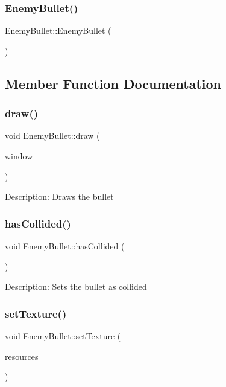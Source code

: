 \subsubsection{\texorpdfstring{EnemyBullet()}{EnemyBullet()}}
{\footnotesize\ttfamily Enemy\+Bullet\+::\+Enemy\+Bullet (\begin{DoxyParamCaption}{ }\end{DoxyParamCaption})}



\subsection{Member Function Documentation}
\mbox{\label{class_enemy_bullet_a8c46608c19627f2ed50882506b43d9bd}} 
\subsubsection{\texorpdfstring{draw()}{draw()}}
{\footnotesize\ttfamily void Enemy\+Bullet\+::draw (\begin{DoxyParamCaption}\item[{sf\+::\+Render\+Window \&}]{window }\end{DoxyParamCaption})}

Description\+: Draws the bullet \mbox{\label{class_enemy_bullet_ad91b04f76ddc0f1d2f26f3dd4d78576f}} 
\subsubsection{\texorpdfstring{hasCollided()}{hasCollided()}}
{\footnotesize\ttfamily void Enemy\+Bullet\+::has\+Collided (\begin{DoxyParamCaption}{ }\end{DoxyParamCaption})}

Description\+: Sets the bullet as collided \mbox{\label{class_enemy_bullet_a48615a287b12f7abcc70a8454a49fb84}} 
\subsubsection{\texorpdfstring{setTexture()}{setTexture()}}
{\footnotesize\ttfamily void Enemy\+Bullet\+::set\+Texture (\begin{DoxyParamCaption}\item[{\mbox{\hyperlink{class_resource_manager}{Resource\+Manager}} \&}]{resources }\end{DoxyParamCaption})}

